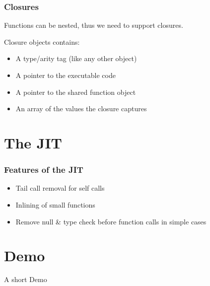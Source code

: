 \documentclass{beamer}
\begin{document}
	\begin{frame}
		\frametitle{Closures}

		Functions can be nested, thus we need to support closures.

		Closure objects contains:
		\begin{itemize}
			\itemsep12pt
		
			\item A type/arity tag (like any other object)
			\item A pointer to the executable code
			\item A pointer to the shared function object
			\item An array of the values the closure captures
		\end{itemize}
	\end{frame}


	\section{The JIT}

	\begin{frame}
		\frametitle{Features of the JIT}
	
		\begin{itemize}
			\itemsep12pt
		
			\item Tail call removal for self calls
			\item Inlining of small functions
			\item Remove null \& type check before function calls in simple cases
		\end{itemize}
	\end{frame}


	\section{Demo}

	\begin{frame}
		\Large
		\begin{center}
			A short Demo
		\end{center}
	\end{frame}

\end{document}

